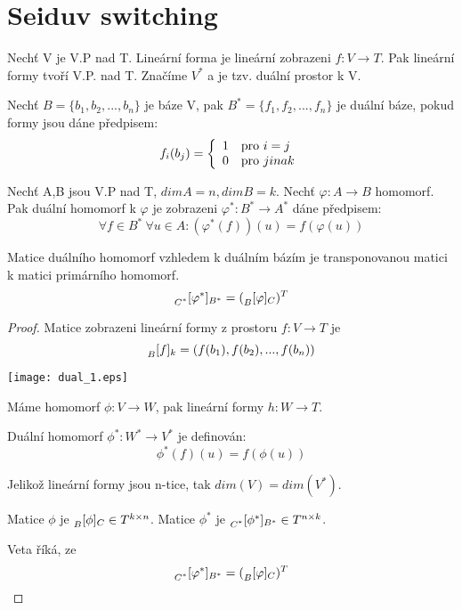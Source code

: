 \section{\texorpdfstring{Seiduv switching}{Seiduv switching}}
\vspace{5mm}
\large

\begin{definition}
Nechť V je V.P nad T. Lineární forma je lineární zobrazeni $f:V \to T$. Pak lineární formy tvoří V.P. nad T. Značíme $V^{\ast}$ a je tzv. duální prostor k V.
\end{definition}
\begin{definition}
Nechť $B = \{b_1, b_2, ..., b_n\}$ je báze V, pak $B^{\ast} = \{ f_1, f_2, ..., f_n \}$ je duální báze, pokud formy jsou dáne předpisem:
\[ f_i(b_j)= \left\{ \begin{array}{ll} 1 & \mbox{pro } i = j \\ 0 & \mbox{pro } jinak \end{array} \right. \]
\end{definition}
\begin{definition}
Nechť A,B jsou V.P nad T, $dimA = n, dimB = k$. Nechť $\varphi:A \to B$ homomorf. Pak duální homomorf k $\varphi$ je zobrazeni $\varphi^{\ast}: B^{\ast} \to A^{\ast}$ dáne předpisem:
\[ \forall f \in B^{\ast}\  \forall u \in A: (\varphi^{\ast}(f))(u) = f(\varphi(u)) \]
\end{definition}


\begin{theorem}
Matice duálního homomorf vzhledem k duálním bázím je transponovanou matici k matici primárního homomorf.
\[ \prescript{}{C^{\ast}}{[\varphi^{\ast}]}_{B^{\ast}} = (\prescript{}{B}{[\varphi]}_{C})^T \]
\end{theorem}
\begin{proof}
	Matice zobrazeni lineární formy z prostoru $f:V \to T$ je
	\[ \prescript{}{B}{[f]}_{k} = (f(b_1), f(b_2),...,f(b_n)) \]

	\texttt{[image: dual\_1.eps]}

	Máme homomorf $\phi:V \to W$, pak lineární formy $h:W \to T$.

	Duální homomorf $\phi^{\ast}:W^{\ast} \to V^{\ast}$ je definován:
	\[ \phi^{\ast}(f)(u) = f(\phi(u)) \]

	Jelikož lineární formy jsou n-tice, tak $dim(V) = dim(V^{\ast})$.

	Matice $\phi$ je $\prescript{}{B}{[\phi]}_{C} \in T^{k \times n}$.
	Matice $\phi^{\ast}$ je $\prescript{}{C^{\ast}}{[\phi^{\ast}]}_{B^{\ast}} \in T^{n \times k}$.

	Veta říká, ze
	\[ \prescript{}{C^{\ast}}{[\varphi^{\ast}]}_{B^{\ast}} = (\prescript{}{B}{[\varphi]}_{C})^T \]
\end{proof}

